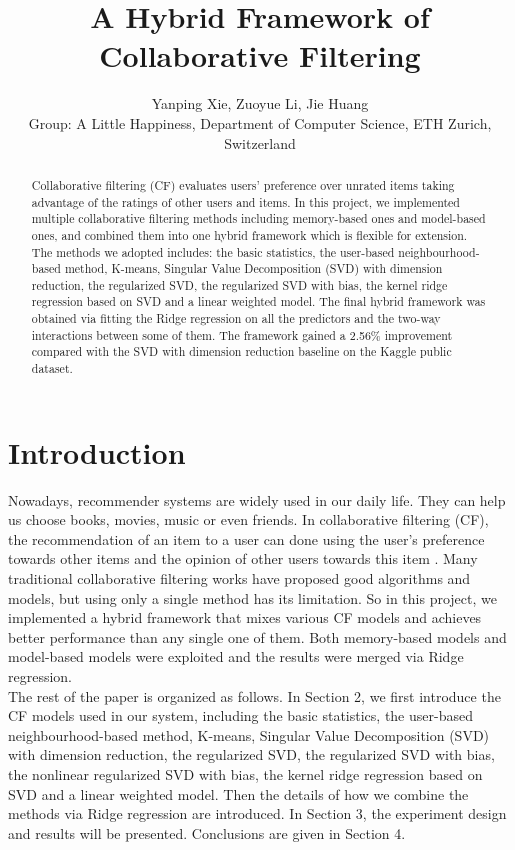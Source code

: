 \documentclass[10pt,conference,compsocconf]{IEEEtran}
\begin{document}
\title{A Hybrid Framework of Collaborative Filtering}

\author{
  Yanping Xie, Zuoyue Li, Jie Huang\\
  Group: A Little Happiness, Department of Computer Science, ETH Zurich, Switzerland\\
}

\maketitle

\begin{abstract}
Collaborative filtering (CF) evaluates users' preference over unrated items taking advantage of the ratings of other
users and items. In this project, we implemented multiple collaborative filtering methods including memory-based ones and model-based ones,
and combined them into one hybrid framework which is flexible for extension. The methods we adopted includes: the basic statistics, the user-based neighbourhood-based method, K-means, Singular Value Decomposition (SVD) with dimension reduction, the regularized SVD, the regularized SVD with bias, the kernel ridge regression based on SVD and a linear weighted model. The final hybrid framework was obtained via fitting the Ridge regression on all the predictors and the two-way interactions between some of them. The framework gained a 2.56\% improvement compared with the SVD with dimension reduction baseline on the Kaggle public dataset.

\end{abstract}

\section{Introduction}

Nowadays, recommender systems are widely used in our daily life. They can help us choose books, movies, music or even friends. In collaborative filtering (CF), the recommendation of an item to a user can done using the user's preference towards other items and the opinion of other users towards this item \cite{Koren2009Matrix}\cite{Linden2003Amazon}. Many traditional collaborative filtering works have proposed good algorithms and models, but using only a single method has its limitation. So in this project, we implemented a hybrid framework that mixes various CF models and achieves better performance than any single one of them. Both memory-based models and model-based models were exploited and the results were merged via Ridge regression. \\
The rest of the paper is organized as follows. In Section 2, we first introduce the CF models used in our system, including the basic statistics, the user-based neighbourhood-based method, K-means, Singular Value Decomposition (SVD) with dimension reduction, the regularized SVD, the regularized SVD with bias, the nonlinear regularized SVD with bias, the kernel ridge regression based on SVD and a linear weighted model. Then the details of how we combine the methods via Ridge regression are introduced. In Section 3, the experiment design and results will be presented. Conclusions are given in Section 4.
\end{document}
